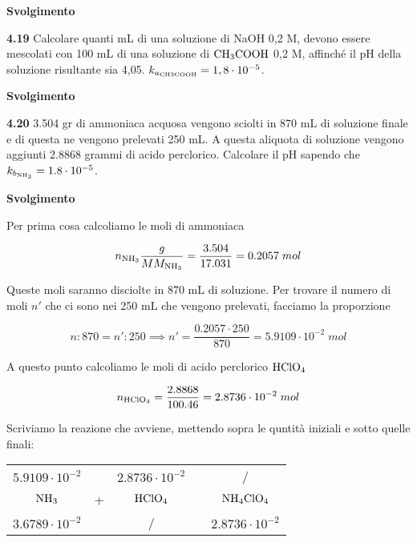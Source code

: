 \vspace{0.2cm}\large\textbf{Svolgimento}\normalsize

\vspace{0.2cm}

\vspace{0.2cm}\textbf{4.19}  Calcolare quanti mL di una soluzione di NaOH 0,2 M, devono essere mescolati con
100 mL di una soluzione di $\rm CH_3COOH$ 0,2 M, affinché il pH della soluzione risultante sia 4,05. $k_{a_{\rm CH3COOH}}= 1,8 \cdot 10^{-5}$.

\vspace{0.2cm}\large\textbf{Svolgimento}\normalsize

\vspace{0.2cm}

\vspace{0.2cm}\textbf{4.20} 3.504 gr di ammoniaca acquosa vengono sciolti in 870 mL di soluzione finale e di questa ne vengono prelevati 250 mL. A questa aliquota di soluzione vengono aggiunti 2.8868 grammi di acido perclorico. Calcolare il pH sapendo che $k_{b_{\rm NH_3}}=1.8 \cdot 10^{-5}$.

\vspace{0.2cm}\large\textbf{Svolgimento}\normalsize

\vspace{0.2cm}Per prima cosa calcoliamo le moli di ammoniaca

$$n_{\rm NH_3}\frac{g}{MM_{\rm NH_3}}
=\frac{3.504}{17.031}=0.2057\;mol$$

Queste moli saranno disciolte in 870 mL di soluzione. Per trovare il numero di moli $n'$ che ci sono nei 250 mL che vengono prelevati, facciamo la proporzione

$$n:870=n':250
\implies
n'=\frac{0.2057 \cdot 250}{870}=5.9109 \cdot 10^{-2}\;mol$$

A questo punto calcoliamo le moli di acido perclorico $\rm HClO_4$

$$n_{\rm HClO_4}=\frac{2.8868}{100.46}=2.8736 \cdot 10^{-2}\;mol$$

Scriviamo la reazione che avviene, mettendo sopra le quntità iniziali e sotto quelle finali:

\begin{center}
    \begin{tabular}{ccccc}
        $5.9109 \cdot 10^{-2}$ &  & $2.8736 \cdot 10^{-2}$ & & /\\
        $\rm NH_3$ & + & $\rm HClO_4$ & \ce{->} & $\rm NH_4ClO_4$\\
        $3.6789 \cdot 10^{-2}$ &  & / & & $2.8736 \cdot 10^{-2}$\\
    \end{tabular}
\end{center}

